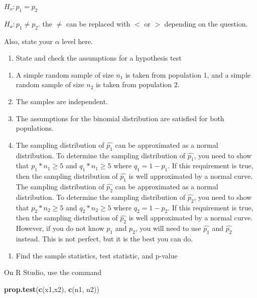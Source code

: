 \documentclass[
]{book}
\newenvironment{Shaded}{\begin{snugshade}}{\end{snugshade}}
\newcommand{\KeywordTok}[1]{\textcolor[rgb]{0.13,0.29,0.53}{\textbf{#1}}}
\newcommand{\NormalTok}[1]{#1}
\providecommand{\tightlist}{%
  \setlength{\itemsep}{0pt}\setlength{\parskip}{0pt}}
\begin{document}
\(H_o:p_1=p_2\)

\(H_a: p_1\ne p_2\). the \(\ne\) can be replaced with \(<\) or \(>\) depending on the question.

Also, state your \(\alpha\) level here.

\begin{enumerate}
\def\labelenumi{\arabic{enumi}.}
\setcounter{enumi}{2}
\tightlist
\item
  State and check the assumptions for a hypothesis test
\end{enumerate}

\begin{enumerate}
\def\labelenumi{\alph{enumi}.}
\item
  A simple random sample of size \(n_1\) is taken from population 1, and a simple random sample of size \(n_2\) is taken from population 2.
\item
  The samples are independent.
\item
  The assumptions for the binomial distribution are satisfied for both populations.
\item
  The sampling distribution of \(\hat{p_1}\) can be approximated as a normal distribution. To determine the sampling distribution of \(\hat{p_1}\), you need to show that \(p_1*n_1\ge5\) and \(q_1*n_1\ge5\) where \(q_1=1-p_1\). If this requirement is true, then the sampling distribution of \(\hat{p_1}\) is well approximated by a normal curve. The sampling distribution of \(\hat{p_2}\) can be approximated as a normal distribution. To determine the sampling distribution of \(\hat{p_2}\), you need to show that \(p_2*n_2\ge 5\) and \(q_2*n_2\ge 5\) where \(q_2=1-p_2\). If this requirement is true, then the sampling distribution of \(\hat{p_2}\) is well approximated by a normal curve. However, if you do not know \(p_1\) and \(p_2\), you will need to use \(\hat{p_1}\) and \(\hat{p_2}\) instead. This is not perfect, but it is the best you can do.
\end{enumerate}

\begin{enumerate}
\def\labelenumi{\arabic{enumi}.}
\setcounter{enumi}{3}
\tightlist
\item
  Find the sample statistics, test statistic, and p-value
\end{enumerate}

On R Studio, use the command

\begin{Shaded}
\begin{Highlighting}[]
\KeywordTok{prop.test}\NormalTok{(}\KeywordTok{c}\NormalTok{(x1,x2), }\KeywordTok{c}\NormalTok{(n1, n2))}
\end{Highlighting}
\end{Shaded}
\end{document}
